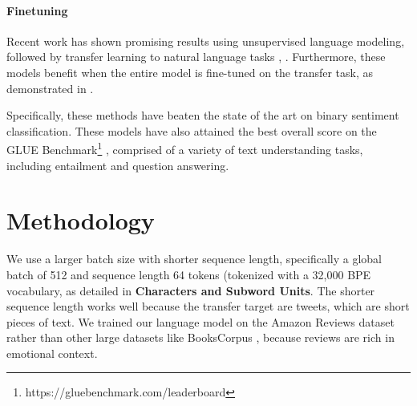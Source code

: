 \documentclass[letterpaper]{article} %
\begin{document}
\begin{table}[ht]
\caption{Inter-rater agreement. Humans don't always agree, even on binary sentiment.}
\label{table:rater-agreement}
\end{table}

\paragraph{Finetuning}
Recent work has shown promising results using unsupervised language modeling, followed by transfer learning to natural language tasks \protect\cite{Radford2017}, \protect\cite{Radford2018}. Furthermore, these models benefit when the entire model is fine-tuned on the transfer task, as demonstrated in \protect\cite{Howard2018}.

Specifically, these methods have beaten the state of the art on binary sentiment classification. These models have also attained the best overall score on the GLUE Benchmark\footnote{https://gluebenchmark.com/leaderboard} \protect\cite{GLUE2018}, comprised of a variety of text understanding tasks, including entailment and question answering.


\section{Methodology}
We use a larger batch size with shorter sequence length, specifically a global batch of 512 and sequence length 64 tokens (tokenized with a 32,000 BPE vocabulary, as detailed in \textbf{Characters and Subword Units}. The shorter sequence length works well because the transfer target are tweets, which are short pieces of text.  We trained our language model on the Amazon Reviews dataset \protect\cite{McAuley2015} rather than other large datasets like BooksCorpus \protect\cite{BooksCorpus2015}, because reviews are rich in emotional context.
\end{document}
